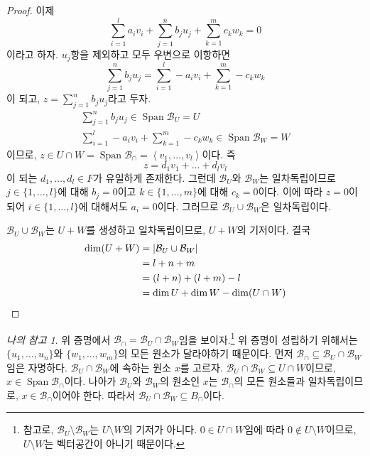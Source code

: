 \documentclass[unfonts,oneside,a4paper]{oblivoir}
\theoremstyle{definition}
\theoremstyle{theorem}
\theoremstyle{theorem}
\theoremstyle{remark}
\theoremstyle{remark}
\newtheorem*{myremark}{나의 참고}
\theoremstyle{remark}
\theoremstyle{remark}
\renewcommand{\vec}[1]{\bm{\mathit{#1}}}
\newcommand{\vecz}{\bm{\mathrm{0}}}
\DeclareMathOperator{\Span}{Span}
\begin{document}
\begin{proof}
    이제
    \begin{equation*}
        \sum_{i = 1}^l a_i \vec v_i + \sum_{j = 1}^n b_j \vec u_j + \sum_{k = 1}^m c_k \vec w_k = \vecz
    \end{equation*}
    이라고 하자.
    $\vec u_j$항을 제외하고 모두 우변으로 이항하면
    \begin{equation*}
        \sum_{j = 1}^n b_j \vec u_j = \sum_{i = 1}^l -a_i \vec v_i + \sum_{k = 1}^m -c_k \vec w_k
    \end{equation*}
    이 되고, $\vec z = \sum_{j = 1}^n b_j \vec u_j$라고 두자.
    \begin{align*}
        \sum_{j = 1}^n b_j \vec u_j \in \Span \mathcal B_U = U\\
        \sum_{i = 1}^l -a_i \vec v_i + \sum_{k = 1}^m -c_k \vec w_k \in \Span \mathcal B_W = W
    \end{align*}
    이므로, $\vec z \in U \cap W = \Span \mathcal B_\cap = \left<\vec v_1, \dots, \vec v_l\right>$이다.
    즉
    \[
        \vec z = d_1 \vec v_1 + \dots + d_l \vec v_l
    \]
    이 되는 $d_1, \dots, \vec d_l \in F$가 유일하게 존재한다.
    그런데 $\mathcal B_U$와 $\mathcal B_W$는 일차독립이므로 $j \in \{1, \dots, l\}$에 대해 $b_j = 0$이고 $k \in \{1, \dots, m\}$에 대해 $c_k = 0$이다.
    이에 따라 $\vec z = \vecz$이 되어 $i \in \{1, \dots, l\}$에 대해서도 $a_i = 0$이다.
    그러므로 $\mathcal B_U \cup \mathcal B_W$은 일차독립이다.

    $\mathcal B_U \cup \mathcal B_W$는 $U + W$를 생성하고 일차독립이므로, $U + W$의 기저이다.
    결국
    \begin{align*}
        \dim (U + W) &= |\mathcal B_U \cup \mathcal B_W|\\
                     &= l + n + m\\
                     &= (l + n) + (l + m) - l\\
                     &= \dim U + \dim W - \dim (U \cap W)\qedhere
    \end{align*}
\end{proof}

\begin{myremark}
    위 증명에서 $\mathcal B_\cap = \mathcal B_U \cap \mathcal B_W$임을 보이자.\footnote{참고로, $\mathcal B_U \setminus \mathcal B_W$는 $U \setminus W$의 기저가 아니다.
    $\vecz \in U \cap W$임에 따라 $\vecz \notin U \setminus W$이므로, $U \setminus W$는 벡터공간이 아니기 때문이다.}
    위 증명이 성립하기 위해서는 $\{\vec u_1, \dots, \vec u_n\}$와 $\{\vec w_1, \dots, \vec w_m\}$의 모든 원소가 달라야하기 때문이다.
    먼저 $\mathcal B_\cap \subseteq \mathcal B_U \cap \mathcal B_W$임은 자명하다.
    $\mathcal B_U \cap \mathcal B_W$에 속하는 원소 $\vec x$를 고르자.
    $\mathcal B_U \cap \mathcal B_W \subseteq U \cap W$이므로, $\vec x \in \Span \mathcal B_\cap$이다.
    나아가 $\mathcal B_U$와 $\mathcal B_W$의 원소인 $\vec x$는 $\mathcal B_\cap$의 모든 원소들과 일차독립이므로, $\vec x \in \mathcal B_\cap$이어야 한다.
    따라서 $\mathcal B_U \cap \mathcal B_W \subseteq B_\cap$이다.
\end{myremark}
\end{document}
